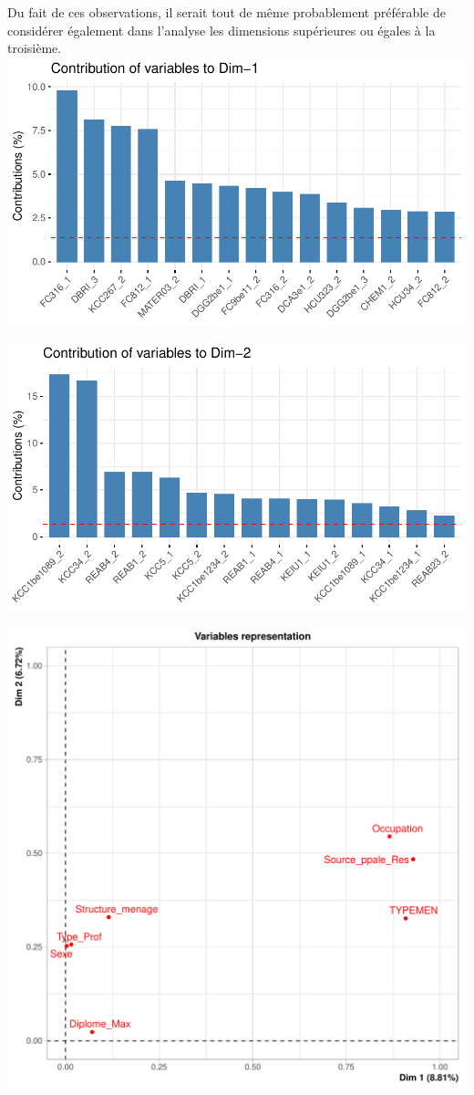 \documentclass[11pt,a4paper, x11names]{article}\usepackage[]{graphicx}\usepackage[]{color}
\makeatletter
\def\maxwidth{ %
  \ifdim\Gin@nat@width>\linewidth
    \linewidth
  \else
    \Gin@nat@width
  \fi
}
\newenvironment{knitrout}{}{} %
\makeatother
\begin{document}
Du fait de ces observations, il serait tout de même probablement préférable de considérer également dans l’analyse les dimensions supérieures ou égales à la troisième.
\begin{knitrout}
\color{fgcolor}
\includegraphics[width=\maxwidth]{figure/unnamed-chunk-13-1} 

\includegraphics[width=\maxwidth]{figure/unnamed-chunk-13-2} 

\includegraphics[width=\maxwidth]{figure/unnamed-chunk-13-3} 


\end{knitrout}
\end{document}
